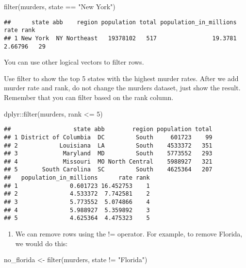 \documentclass[
]{article}
\newenvironment{Shaded}{\begin{snugshade}}{\end{snugshade}}
\newcommand{\DecValTok}[1]{\textcolor[rgb]{0.00,0.00,0.81}{#1}}
\newcommand{\FunctionTok}[1]{\textcolor[rgb]{0.00,0.00,0.00}{#1}}
\newcommand{\NormalTok}[1]{#1}
\newcommand{\OtherTok}[1]{\textcolor[rgb]{0.56,0.35,0.01}{#1}}
\newcommand{\SpecialCharTok}[1]{\textcolor[rgb]{0.00,0.00,0.00}{#1}}
\newcommand{\StringTok}[1]{\textcolor[rgb]{0.31,0.60,0.02}{#1}}
\providecommand{\tightlist}{%
  \setlength{\itemsep}{0pt}\setlength{\parskip}{0pt}}
\begin{document}
\begin{Shaded}
\begin{Highlighting}[]
\FunctionTok{filter}\NormalTok{(murders, state }\SpecialCharTok{==} \StringTok{"New York"}\NormalTok{)}
\end{Highlighting}
\end{Shaded}

\begin{verbatim}
##      state abb    region population total population_in_millions    rate rank
## 1 New York  NY Northeast   19378102   517                19.3781 2.66796   29
\end{verbatim}

You can use other logical vectors to filter rows.

Use filter to show the top 5 states with the highest murder rates. After
we add murder rate and rank, do not change the murders dataset, just
show the result. Remember that you can filter based on the rank column.

\begin{Shaded}
\begin{Highlighting}[]
\NormalTok{dplyr}\SpecialCharTok{::}\FunctionTok{filter}\NormalTok{(murders, rank }\SpecialCharTok{\textless{}=} \DecValTok{5}\NormalTok{)}
\end{Highlighting}
\end{Shaded}

\begin{verbatim}
##                  state abb        region population total
## 1 District of Columbia  DC         South     601723    99
## 2            Louisiana  LA         South    4533372   351
## 3             Maryland  MD         South    5773552   293
## 4             Missouri  MO North Central    5988927   321
## 5       South Carolina  SC         South    4625364   207
##   population_in_millions      rate rank
## 1               0.601723 16.452753    1
## 2               4.533372  7.742581    2
## 3               5.773552  5.074866    4
## 4               5.988927  5.359892    3
## 5               4.625364  4.475323    5
\end{verbatim}

\begin{enumerate}
\def\labelenumi{\arabic{enumi}.}
\setcounter{enumi}{4}
\tightlist
\item
  We can remove rows using the != operator. For example, to remove
  Florida, we would do this:
\end{enumerate}

\begin{Shaded}
\begin{Highlighting}[]
\NormalTok{no\_florida }\OtherTok{\textless{}{-}} \FunctionTok{filter}\NormalTok{(murders, state }\SpecialCharTok{!=} \StringTok{"Florida"}\NormalTok{)}
\end{Highlighting}
\end{Shaded}
\end{document}
